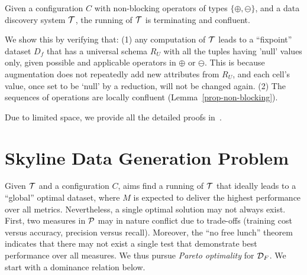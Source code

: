 {\begin{proposition}
\label{thm-cr}
Given a configuration $C$ with non-blocking operators 
of types $\{\oplus, \ominus\}$, 
and a data discovery 
system $\T$, the running of 
$\T$ is terminating and confluent. 
\end{proposition}

We show this by verifying that: 
(1) any computation of $\T$ leads to a ``fixpoint'' 
dataset $D_f$ that has a universal schema $R_U$ with 
all the tuples having 'null' values only,  
given possible and applicable 
operators in $\oplus$ or $\ominus$. 
This is because augmentation does not 
repeatedly add new attributes from $R_U$, 
and each cell's value, once set to be `null' by 
a reduction, will not be changed again. 
(2) The sequences of operations are 
locally confluent (Lemma~\ref{prop-non-blocking}). 

Due to limited space, we provide 
all the detailed proofs in~\cite{full}. 

} 
\vspace{-1ex}
\section{Skyline Data Generation Problem} 
\label{sec-problem}


Given $\T$ and a configuration $C$, \modis  
aims find a running 
of $\T$ that ideally leads to a ``global'' optimal dataset, where $M$ is expected to deliver the highest performance over all metrics. Nevertheless, a single optimal solution may not always exist. 
First, %
two measures in $\P$ may 
in nature conflict 
due to trade-offs (\eg training cost versus accuracy, precision versus recall). 
Moreover, the ``no free lunch'' 
theorem~\cite{sterkenburg2021no} 
indicates that there may not exist a single test that demonstrate best performance 
over all measures. 
We thus pursue {\em Pareto optimality} for $\D_F$. We start with
a dominance relation below. 

